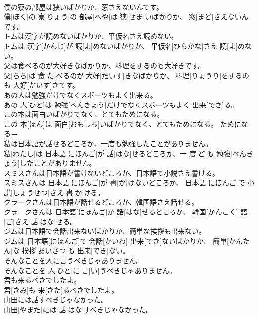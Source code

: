 \documentclass[8pt]{extreport}
\begin{document}
\begin{CJK}{UTF8}{min}
\\	僕の寮の部屋は狭いばかりか、窓さえないんです。	
\\	僕[ぼく]の 寮[りょう]の 部屋[へや]は 狭[せま]いばかりか、 窓[まど]さえないんです。	
\\	トムは漢字が読めないばかりか、平仮名さえ読めない。	
\\	トムは 漢字[かんじ]が 読[よ]めないばかりか、 平仮名[ひらがな]さえ 読[よ]めない。	
\\	父は食べるのが大好きなばかりか、料理をするのも大好きです。	
\\	父[ちち]は 食[た]べるのが 大好[だいす]きなばかりか、 料理[りょうり]をするのも 大好[だいす]きです。	
\\	あの人は勉強だけでなくスポーツもよく出来る。	
\\	あの 人[ひと]は 勉強[べんきょう]だけでなくスポーツもよく 出来[でき]る。	
\\	この本は面白いばかりでなく、とてもためになる。	
\\	この 本[ほん]は 面白[おもしろ]いばかりでなく、とてもためになる。	ためになる＝ 
\\	私は日本語が話せるどころか、一度も勉強したことがありません。	
\\	私[わたし]は 日本語[にほんご]が 話[はな]せるどころか、一 度[ど]も 勉強[べんきょう]したことがありません。	
\\	スミスさんは日本語が書けないどころか、日本語で小説さえ書ける。	
\\	スミスさんは 日本語[にほんご]が 書[か]けないどころか、 日本語[にほんご]で 小説[しょうせつ]さえ 書[か]ける。	
\\	クラークさんは日本語が話せるどころか、韓国語さえ話せる。	
\\	クラークさんは 日本語[にほんご]が 話[はな]せるどころか、 韓国[かんこく] 語[ご]さえ 話[はな]せる。	
\\	ジムは日本語で会話出来ないばかりか、簡単な挨拶も出来ない。	
\\	ジムは 日本語[にほんご]で 会話[かいわ] 出来[でき]ないばかりか、 簡単[かんたん]な 挨拶[あいさつ]も 出来[でき]ない。	
\\	そんなことを人に言うべきじゃありません。	
\\	そんなことを 人[ひと]に 言[い]うべきじゃありません。	
\\	君も来るべきでしたよ。	
\\	君[きみ]も 来[きた]るべきでしたよ。	
\\	山田には話すべきじゃなかった。	
\\	山田[やまだ]には 話[はな]すべきじゃなかった。	

\end{CJK}
\end{document}
